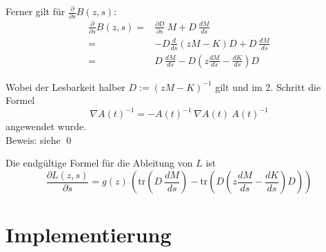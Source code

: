 \documentclass[a4paper,12pt]{report}
\newcommand{\R}{\mathbb R}
\newcommand{\C}{\mathbb C}
\newcommand{\klammer}[1]{\left(#1\right)}
\newcommand{\tr}{\text{tr}}
\newcommand{\Cnn}{\C^{n\times n}}
\newcommand{\inv}{^{-1}}
\newcommand{\1}{\mathds{1}}
\theoremstyle{plain} %
\theoremstyle{definition} %
\theoremstyle{remark}
\begin{document}
            Ferner gilt für $\frac{\partial}{\partial s} B(z, s)$:
            \begin{align*}
                  \frac{\partial}{\partial s} B(z, s) =& \frac{\partial D}{\partial s} \ M + D \ \frac{dM}{ds}\\
                  =& - D \frac{d}{ds}(zM-K) D + D \ \frac{dM}{ds}\\
                  =& D \ \frac{dM}{ds} - D \klammer{z \frac{dM}{ds}-\frac{dK}{ds}} D
            \end{align*}

            Wobei der Lesbarkeit halber $D:=(zM-K)\inv$ gilt und im 2. Schritt die Formel
            $$\nabla A(t)\inv = -A(t)\inv\ \nabla A(t)\ A(t)\inv$$
            angewendet wurde.\\
            Beweis: siehe \cite{derivativeInverseMatrix}\qed

            Die endgültige Formel für die Ableitung von $L$ ist
            \begin{equation}
                  \label{eqn: vollständigeAblL}
                  \frac{\partial L(z,s)}{\partial s} = g(z)\,\klammer{\tr\klammer{D \ \frac{dM}{ds}} - \tr\klammer{D \klammer{z \frac{dM}{ds}-\frac{dK}{ds}} D}}
            \end{equation}
            




\chapter{Implementierung}
\label{sec: Programmieren}
\end{document}
